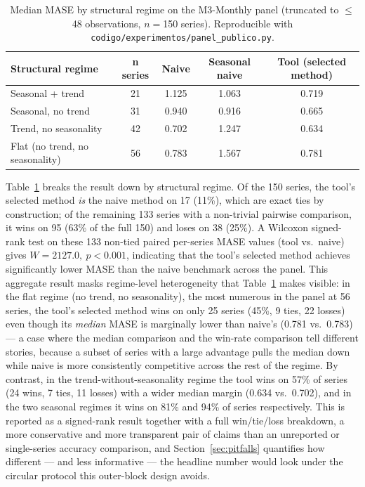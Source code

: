 \documentclass[forecasting,article,submit,pdftex,moreauthors]{Definitions/mdpi}
\begin{document}
\begin{table}[H]
\caption{Median MASE by structural regime on the M3-Monthly panel (truncated to $\leq$48 observations, $n=$150 series). Reproducible with \texttt{codigo/\allowbreak experimentos/\allowbreak panel\_\allowbreak publico.py}.\label{tab:panel}}
\centering
\begin{tabularx}{\textwidth}{Xcccc}
\toprule
\textbf{Structural regime} & \textbf{n series} & \textbf{Naive} & \textbf{Seasonal naive} & \textbf{Tool (selected method)} \\
\midrule
Seasonal + trend & 21 & 1.125 & 1.063 & 0.719 \\
Seasonal, no trend & 31 & 0.940 & 0.916 & 0.665 \\
Trend, no seasonality & 42 & 0.702 & 1.247 & 0.634 \\
Flat (no trend, no seasonality) & 56 & 0.783 & 1.567 & 0.781 \\
\bottomrule
\end{tabularx}
\end{table}

Table~\ref{tab:panel} breaks the result down by structural regime. Of the 150 series, the tool's selected method \emph{is} the naive method on 17 (11\%), which are exact ties by construction; of the remaining 133 series with a non-trivial pairwise comparison, it wins on 95 (63\% of the full 150) and loses on 38 (25\%). A Wilcoxon signed-rank test on these 133 non-tied paired per-series MASE values (tool vs.\ naive) gives $W=2127.0,\ p<0.001$, indicating that the tool's selected method achieves significantly lower MASE than the naive benchmark across the panel. This aggregate result masks regime-level heterogeneity that Table~\ref{tab:panel} makes visible: in the flat regime (no trend, no seasonality), the most numerous in the panel at 56 series, the tool's selected method wins on only 25 series (45\%, 9 ties, 22 losses) even though its \emph{median} MASE is marginally lower than naive's (0.781 vs.\ 0.783) --- a case where the median comparison and the win-rate comparison tell different stories, because a subset of series with a large advantage pulls the median down while naive is more consistently competitive across the rest of the regime. By contrast, in the trend-without-seasonality regime the tool wins on 57\% of series (24 wins, 7 ties, 11 losses) with a wider median margin (0.634 vs.\ 0.702), and in the two seasonal regimes it wins on 81\% and 94\% of series respectively. This is reported as a signed-rank result together with a full win/tie/loss breakdown, a more conservative and more transparent pair of claims than an unreported or single-series accuracy comparison, and Section~\ref{sec:pitfalls} quantifies how different --- and less informative --- the headline number would look under the circular protocol this outer-block design avoids.
\end{document}
